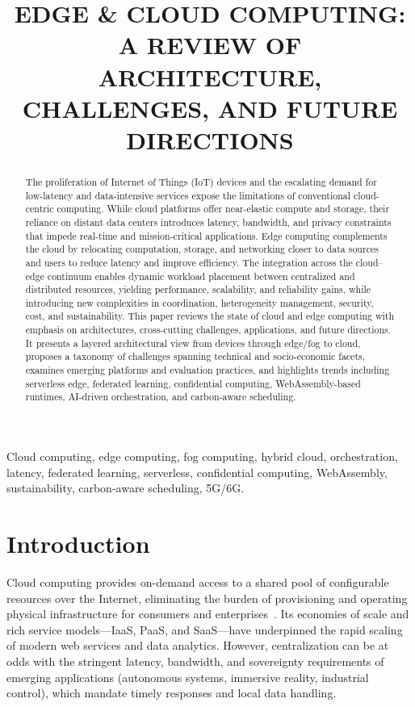 \documentclass[conference]{IEEEtran}
\title{EDGE \& CLOUD COMPUTING: A REVIEW OF ARCHITECTURE, CHALLENGES, AND FUTURE DIRECTIONS}
\author{\IEEEauthorblockN{Author Name}\IEEEauthorblockA{Affiliation \\ Email}}
\begin{document}
\maketitle

\begin{abstract}
The proliferation of Internet of Things (IoT) devices and the escalating demand for low-latency and data-intensive services expose the limitations of conventional cloud-centric computing. While cloud platforms offer near-elastic compute and storage, their reliance on distant data centers introduces latency, bandwidth, and privacy constraints that impede real-time and mission-critical applications. Edge computing complements the cloud by relocating computation, storage, and networking closer to data sources and users to reduce latency and improve efficiency. The integration across the cloud--edge continuum enables dynamic workload placement between centralized and distributed resources, yielding performance, scalability, and reliability gains, while introducing new complexities in coordination, heterogeneity management, security, cost, and sustainability. This paper reviews the state of cloud and edge computing with emphasis on architectures, cross-cutting challenges, applications, and future directions. It presents a layered architectural view from devices through edge/fog to cloud, proposes a taxonomy of challenges spanning technical and socio-economic facets, examines emerging platforms and evaluation practices, and highlights trends including serverless edge, federated learning, confidential computing, WebAssembly-based runtimes, AI-driven orchestration, and carbon-aware scheduling.
\end{abstract}

\begin{IEEEkeywords}
Cloud computing, edge computing, fog computing, hybrid cloud, orchestration, latency, federated learning, serverless, confidential computing, WebAssembly, sustainability, carbon-aware scheduling, 5G/6G.
\end{IEEEkeywords}

\section{Introduction}
Cloud computing provides on-demand access to a shared pool of configurable resources over the Internet, eliminating the burden of provisioning and operating physical infrastructure for consumers and enterprises~\cite{Mell2011NIST,Armbrust2010CACM}. Its economies of scale and rich service models---IaaS, PaaS, and SaaS---have underpinned the rapid scaling of modern web services and data analytics. However, centralization can be at odds with the stringent latency, bandwidth, and sovereignty requirements of emerging applications (autonomous systems, immersive reality, industrial control), which mandate timely responses and local data handling.
\end{document}
